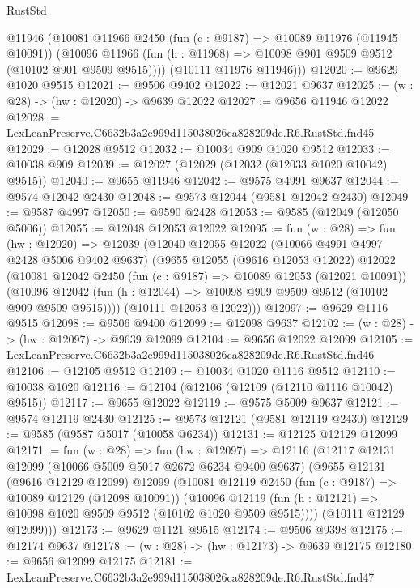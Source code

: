 \begin{lexlean}{RustStd}
\begin{coremodule}
        @11946
        (@10081
          @11966
          @2450
          (fun (c : @9187) => @10089 @11976 (@11945 @10091))
          (@10096 @11966 (fun (h : @11968) => @10098 @901 @9509 @9512 (@10102 @901 @9509 @9515))))
        (@10111 @11976 @11946)))
@12020 := @9629 @1020 @9515
@12021 := @9506 @9402
@12022 := @12021 @9637
@12025 := (w : @28) -> (hw : @12020) -> @9639 @12022
@12027 := @9656 @11946 @12022
@12028 := LexLeanPreserve.C6632b3a2e999d115038026ca828209de.R6.RustStd.fnd45
@12029 := @12028 @9512
@12032 := @10034 @909 @1020 @9512
@12033 := @10038 @909
@12039 := @12027 (@12029 (@12032 (@12033 @1020 @10042) @9515))
@12040 := @9655 @11946
@12042 := @9575 @4991 @9637
@12044 := @9574 @12042 @2430
@12048 := @9573 @12044 (@9581 @12042 @2430)
@12049 := @9587 @4997
@12050 := @9590 @2428
@12053 := @9585 (@12049 (@12050 @5006))
@12055 := @12048 @12053 @12022
@12095 := fun (w : @28) =>
  fun (hw : @12020) =>
  @12039
    (@12040
      @12055
      @12022
      (@10066 @4991 @4997 @2428 @5006 @9402 @9637)
      (@9655
        @12055
        (@9616 @12053 @12022)
        @12022
        (@10081
          @12042
          @2450
          (fun (c : @9187) => @10089 @12053 (@12021 @10091))
          (@10096 @12042 (fun (h : @12044) => @10098 @909 @9509 @9512 (@10102 @909 @9509 @9515))))
        (@10111 @12053 @12022)))
@12097 := @9629 @1116 @9515
@12098 := @9506 @9400
@12099 := @12098 @9637
@12102 := (w : @28) -> (hw : @12097) -> @9639 @12099
@12104 := @9656 @12022 @12099
@12105 := LexLeanPreserve.C6632b3a2e999d115038026ca828209de.R6.RustStd.fnd46
@12106 := @12105 @9512
@12109 := @10034 @1020 @1116 @9512
@12110 := @10038 @1020
@12116 := @12104 (@12106 (@12109 (@12110 @1116 @10042) @9515))
@12117 := @9655 @12022
@12119 := @9575 @5009 @9637
@12121 := @9574 @12119 @2430
@12125 := @9573 @12121 (@9581 @12119 @2430)
@12129 := @9585 (@9587 @5017 (@10058 @6234))
@12131 := @12125 @12129 @12099
@12171 := fun (w : @28) =>
  fun (hw : @12097) =>
  @12116
    (@12117
      @12131
      @12099
      (@10066 @5009 @5017 @2672 @6234 @9400 @9637)
      (@9655
        @12131
        (@9616 @12129 @12099)
        @12099
        (@10081
          @12119
          @2450
          (fun (c : @9187) => @10089 @12129 (@12098 @10091))
          (@10096 @12119 (fun (h : @12121) => @10098 @1020 @9509 @9512 (@10102 @1020 @9509 @9515))))
        (@10111 @12129 @12099)))
@12173 := @9629 @1121 @9515
@12174 := @9506 @9398
@12175 := @12174 @9637
@12178 := (w : @28) -> (hw : @12173) -> @9639 @12175
@12180 := @9656 @12099 @12175
@12181 := LexLeanPreserve.C6632b3a2e999d115038026ca828209de.R6.RustStd.fnd47

\end{coremodule}
\end{lexlean}
